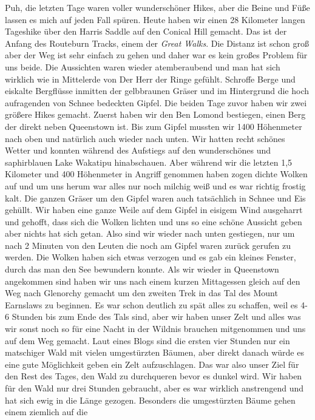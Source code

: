 \documentclass[11pt]{book}
\begin{document}
Puh, die letzten Tage waren voller wunderschöner Hikes, aber die Beine und Füße lassen es mich auf jeden Fall spüren. Heute 
haben wir einen 28 Kilometer langen Tageshike über den Harris Saddle auf den Conical Hill gemacht. Das ist der Anfang des Routeburn 
Tracks, einem der \emph{Great Walks}. Die Distanz ist schon groß aber der Weg ist sehr einfach zu gehen und daher war es kein 
großes Problem für uns beide. Die Aussichten waren wieder atemberaubend und man hat sich wirklich wie in Mittelerde von Der Herr 
der Ringe gefühlt. Schroffe Berge und eiskalte Bergflüsse inmitten der gelbbraunen Gräser und im Hintergrund die hoch aufragenden 
von Schnee bedeckten Gipfel. Die beiden Tage zuvor haben wir zwei größere Hikes gemacht. Zuerst haben wir den Ben Lomond bestiegen, 
einen Berg der direkt neben Queenstown ist. Bis zum Gipfel mussten wir 1400 Höhenmeter nach oben und natürlich auch wieder nach unten. 
Wir hatten recht schönes Wetter und konnten während des Aufstiegs auf den wunderschönes und saphirblauen Lake Wakatipu hinabschauen. 
Aber während wir die letzten 1,5 Kilometer und 400 Höhenmeter in Angriff genommen haben zogen dichte Wolken auf und um uns herum 
war alles nur noch milchig weiß und es war richtig frostig kalt. Die ganzen Gräser um den Gipfel waren auch tatsächlich in Schnee und 
Eis gehüllt. Wir haben eine ganze Weile auf dem Gipfel in eisigem Wind ausgeharrt und gehofft, dass sich die Wolken lichten und uns 
so eine schöne Aussicht geben aber nichts hat sich getan. Also sind wir wieder nach unten gestiegen, nur um nach 2 Minuten von den Leuten die noch 
am Gipfel waren zurück gerufen zu werden. Die Wolken haben sich etwas verzogen und es gab ein kleines Fenster, durch das man den 
See bewundern konnte. Als wir wieder in Queenstown angekommen sind haben wir uns nach einem kurzen Mittagessen gleich auf den 
Weg nach Glenorchy gemacht um den zweiten Trek in das Tal des Mount Earnslaws zu beginnen. Es war schon deutlich zu spät alles zu 
schaffen, weil es 4-6 Stunden bis zum Ende des Tals sind, aber wir haben unser Zelt und alles was wir sonst noch so für eine Nacht 
in der Wildnis brauchen mitgenommen und uns auf dem Weg gemacht. Laut eines Blogs sind die ersten vier Stunden nur ein matschiger 
Wald mit vielen umgestürzten Bäumen, aber direkt danach würde es eine gute Möglichkeit geben ein Zelt aufzuschlagen. Das war also unser 
Ziel für den Rest des Tages, den Wald zu durchqueren bevor es dunkel wird. Wir haben für den Wald nur drei Stunden gebraucht, 
aber es war wirklich anstrengend und hat sich ewig in die Länge gezogen. Besonders die umgestürzten Bäume gehen einem ziemlich auf die 
\end{document}
